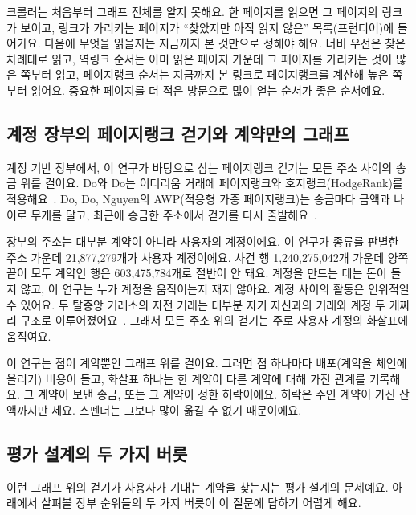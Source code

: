 \begin{puri}
크롤러는 처음부터 그래프 전체를 알지 못해요. 한 페이지를 읽으면 그 페이지의 링크가 보이고, 링크가 가리키는 페이지가 “찾았지만 아직 읽지 않은” 목록(프런티어)에 들어가요. 다음에 무엇을 읽을지는 지금까지 본 것만으로 정해야 해요. 너비 우선은 찾은 차례대로 읽고, 역링크 순서는 이미 읽은 페이지 가운데 그 페이지를 가리키는 것이 많은 쪽부터 읽고, 페이지랭크 순서는 지금까지 본 링크로 페이지랭크를 계산해 높은 쪽부터 읽어요. 중요한 페이지를 더 적은 방문으로 많이 얻는 순서가 좋은 순서예요.
\end{puri}

\subsection{계정 장부의 페이지랭크 걷기와 계약만의 그래프}

계정 기반 장부에서, 이 연구가 바탕으로 삼는 페이지랭크 걷기는 모든 주소 사이의 송금 위를 걸어요. Do와 Do는 이더리움 거래에 페이지랭크와 호지랭크(HodgeRank)를 적용해요~\cite{do2023hodgerank}. Do, Do, Nguyen의 AWP(적응형 가중 페이지랭크)는 송금마다 금액과 나이로 무게를 달고, 최근에 송금한 주소에서 걷기를 다시 출발해요~\cite{do2023awp}.

장부의 주소는 대부분 계약이 아니라 사용자의 계정이에요. 이 연구가 종류를 판별한 주소 가운데 21,877,279개가 사용자 계정이에요. 사건 행 1,240,275,042개 가운데 양쪽 끝이 모두 계약인 행은 603,475,784개로 절반이 안 돼요. 계정을 만드는 데는 돈이 들지 않고, 이 연구는 누가 계정을 움직이는지 재지 않아요. 계정 사이의 활동은 인위적일 수 있어요. 두 탈중앙 거래소의 자전 거래는 대부분 자기 자신과의 거래와 계정 두 개짜리 구조로 이루어졌어요~\cite{victor2021washtrading}. 그래서 모든 주소 위의 걷기는 주로 사용자 계정의 화살표에 움직여요.

이 연구는 점이 계약뿐인 그래프 위를 걸어요. 그러면 점 하나마다 배포(계약을 체인에 올리기) 비용이 들고, 화살표 하나는 한 계약이 다른 계약에 대해 가진 관계를 기록해요. 그 계약이 보낸 송금, 또는 그 계약이 정한 허락이에요. 허락은 주인 계약이 가진 잔액까지만 세요. 스펜더는 그보다 많이 옮길 수 없기 때문이에요.

\subsection{평가 설계의 두 가지 버릇}

이런 그래프 위의 걷기가 사용자가 기대는 계약을 찾는지는 평가 설계의 문제예요. 아래에서 살펴볼 장부 순위들의 두 가지 버릇이 이 질문에 답하기 어렵게 해요.

